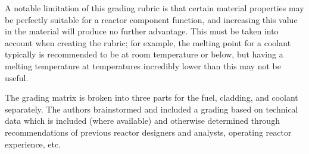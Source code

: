 \documentclass[]{report}
\begin{document}
A notable limitation of this grading rubric is that certain material properties may be perfectly suitable for a reactor component function, and increasing this value in the material will produce no further advantage.  This must be taken into account when creating the rubric; for example, the melting point for a coolant typically is recommended to be at room temperature or below, but having a melting temperature at temperatures incredibly lower than this may not be useful.

The grading matrix is broken into three parts for the fuel, cladding, and coolant separately.  The authors brainstormed and included a grading based on technical data which is included (where available) and otherwise determined through recommendations of previous reactor designers and analysts, operating reactor experience, etc.
\end{document}
